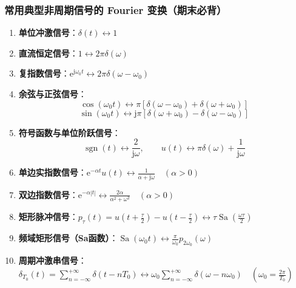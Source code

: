 \documentclass[11pt,a4paper,fontset=fandol]{ctexart}
\theoremstyle{remark}
\begin{document}
\subsubsection{常用典型非周期信号的 Fourier 变换（期末必背）}
\begin{enumerate}
    \item \textbf{单位冲激信号}：$\delta(t) \longleftrightarrow 1$
    \item \textbf{直流恒定信号}：$1 \longleftrightarrow 2\pi\delta(\omega)$
    \item \textbf{复指数信号}：$\mathrm{e}^{\mathrm{j}\omega_0 t} \longleftrightarrow 2\pi\delta(\omega - \omega_0)$
    \item \textbf{余弦与正弦信号}：
    \begin{equation}
        \cos(\omega_0 t) \longleftrightarrow \pi[\delta(\omega - \omega_0) + \delta(\omega + \omega_0)]
    \end{equation}
    \begin{equation}
        \sin(\omega_0 t) \longleftrightarrow \mathrm{j}\pi[\delta(\omega + \omega_0) - \delta(\omega - \omega_0)]
    \end{equation}
    \item \textbf{符号函数与单位阶跃信号}：
    \begin{equation}
        \operatorname{sgn}(t) \longleftrightarrow \frac{2}{\mathrm{j}\omega}, \qquad u(t) \longleftrightarrow \pi\delta(\omega) + \frac{1}{\mathrm{j}\omega}
    \end{equation}
    \item \textbf{单边实指数信号}：$\mathrm{e}^{-\alpha t}u(t) \longleftrightarrow \frac{1}{\alpha + \mathrm{j}\omega} \quad (\alpha > 0)$
    \item \textbf{双边指数信号}：$\mathrm{e}^{-\alpha|t|} \longleftrightarrow \frac{2\alpha}{\alpha^2 + \omega^2} \quad (\alpha > 0)$
    \item \textbf{矩形脉冲信号}：$p_\tau(t) = u\left(t + \frac{\tau}{2}\right) - u\left(t - \frac{\tau}{2}\right) \longleftrightarrow \tau \operatorname{Sa}\left(\frac{\omega\tau}{2}\right)$
    \item \textbf{频域矩形信号（Sa函数）}：$\operatorname{Sa}(\omega_0 t) \longleftrightarrow \frac{\pi}{\omega_0} p_{2\omega_0}(\omega)$
    \item \textbf{周期冲激串信号}：$\delta_{T_0}(t) = \sum_{n=-\infty}^{+\infty} \delta(t - n T_0) \longleftrightarrow \omega_0 \sum_{n=-\infty}^{+\infty} \delta(\omega - n\omega_0) \quad \left(\omega_0 = \frac{2\pi}{T_0}\right)$
\end{enumerate}
\end{document}
